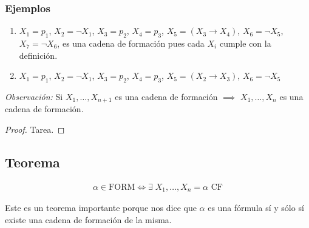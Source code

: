 \subsubsection{Ejemplos}

\begin{enumerate}
    \item $X_1 = p_1$, $X_2 = \neg X_1$, $X_3 = p_2$, $X_4 = p_3$, 
    $X_5 = (X_3 \to X_4)$, $X_6 = \neg X_5$, $X_7 = \neg X_6$, es una cadena
    de formación pues cada $X_i$ cumple con la definición.

    \item $X_1 = p_1$, $X_2 = \neg X_1$, $X_3 = p_2$, $X_4 = p_3$,
        $X_5 = (X_2 \to X_3)$, $X_6 = \neg X_5$
\end{enumerate}

\bigskip
\textit{Observación:}
%
Si $X_1, \dotsc, X_{n+1}$ es una cadena de formación $\implies$ 
$X_1, \dotsc, X_n$ es una cadena de formación.

\begin{proof} \phantom{.}
    Tarea.
\end{proof}

\subsection{Teorema}

\begin{teorema}{}{}
    \begin{gather*}
        \alpha \in \mathrm{FORM} \iff \exists \; X_1, \dotsc, X_n = \alpha 
        \text{ CF}
    \end{gather*}
\end{teorema}

Este es un teorema importante porque nos dice que $\alpha$ es una fórmula 
sí y sólo sí existe una cadena de formación de la misma.


